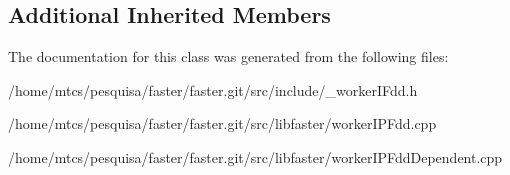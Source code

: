 \subsection*{Additional Inherited Members}


The documentation for this class was generated from the following files\+:\begin{DoxyCompactItemize}
\item 
/home/mtcs/pesquisa/faster/faster.\+git/src/include/\+\_\+worker\+I\+Fdd.\+h\item 
/home/mtcs/pesquisa/faster/faster.\+git/src/libfaster/worker\+I\+P\+Fdd.\+cpp\item 
/home/mtcs/pesquisa/faster/faster.\+git/src/libfaster/worker\+I\+P\+Fdd\+Dependent.\+cpp\end{DoxyCompactItemize}
